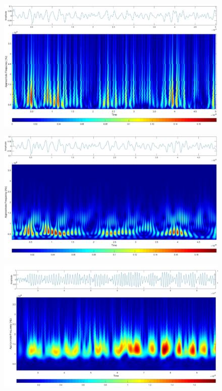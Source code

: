 \begin{refsection}
\begin{figure}
	\centering
	\centering
	\includegraphics[width=1\linewidth]{papers/gis/Bilder/UnschRelHaar}
	\label{fig:UnschRelHaar}
\end{figure}
\begin{figure}
	\centering
	\includegraphics[width=1\linewidth]{papers/gis/Bilder/UnschRelMorl}
	\label{fig:UnschRelMorl}
\end{figure}
\begin{figure}
	\centering
	\includegraphics[width=1\linewidth]{papers/gis/Bilder/cgau5}
	\label{fig:cgau5}
\end{figure}


\end{refsection}
